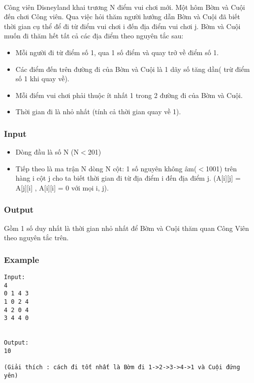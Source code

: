 

 

Công viên Disneyland khai trương N điểm vui chơi mới. Một hôm Bờm và Cuội đến chơi Công viên. Qua việc hỏi thăm người hướng dẫn Bờm và Cuội đã biết thời gian cụ thể để đi từ điểm vui chơi i đến địa điểm vui chơi j. Bờm và Cuội muốn đi thăm hết tất cả các địa điểm theo nguyên tắc sau:
\begin{itemize}
	\item Mỗi người đi từ điểm số 1, qua 1 số điểm và quay trở về điểm số 1.
	\item Các điểm đến trên đường đi của Bờm và Cuội là 1 dãy số tăng dần( trừ điểm số 1 khi quay về).
	\item Mỗi điểm vui chơi phải thuộc ít nhất 1 trong 2 đường đi của Bờm và Cuội.
	\item Thời gian đi là nhỏ nhất (tính cả thời gian quay về 1).
\end{itemize}

\subsubsection{Input}
\begin{itemize}
	\item Dòng đầu là số N (N$<$201)
	\item Tiếp theo là ma trận N dòng N cột: 1 số nguyên không âm($<$1001) trên hàng i cột j cho ta biết thời gian đi từ địa điểm i đến địa điểm j. (A[i][j] = A[j][i] , A[i][i] = 0 với mọi i, j).
\end{itemize}

\subsubsection{Output}

Gồm 1 số duy nhất là thời gian nhỏ nhất để Bờm và Cuội thăm quan Công Viên theo nguyên tắc trên.

\subsubsection{Example}
\begin{verbatim}
Input:
4
0 1 4 3
1 0 2 4
4 2 0 4
3 4 4 0


Output:
10

(Giải thích : cách đi tốt nhất là Bờm đi 1->2->3->4->1 và Cuội đứng yên)
\end{verbatim}
